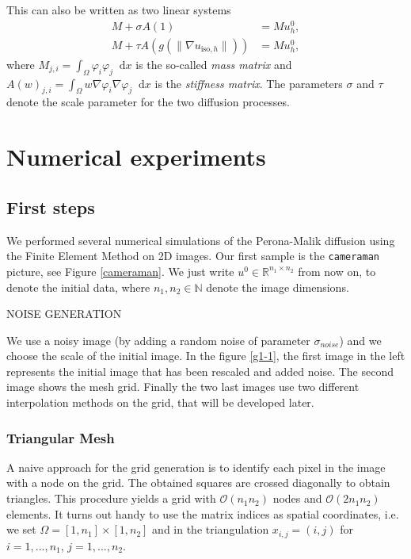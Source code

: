 \documentclass{report}
\renewcommand*\d{\mathop{}\!\mathrm{d}}
\renewcommand\phi{\varphi}
\renewcommand\O{\mathcal{O}}
\def\N{\mathbb{N}}
\def\R{\mathbb{R}}
\def\iso{\text{iso}}
\begin{document}
This can also be written as two linear systems
\begin{align}
	M + \sigma A(1) &= M u^0_h, \\
	M + \tau A(g(\|\nabla u_{\iso,h}\|)) &= M u^0_h,
\end{align}
where $M_{j,i} = \int_\Omega \phi_i \phi_j \d x$ is the so-called \emph{mass matrix} and $A(w)_{j,i} = \int_\Omega w \nabla \phi_i \nabla \phi_j \d x$ is the \emph{stiffness matrix}. The parameters $\sigma$ and $\tau$ denote the scale parameter for the two diffusion processes.

\section{Numerical experiments}

\subsection{First steps} 

We performed several numerical simulations of the Perona-Malik diffusion using the Finite Element Method on 2D images. Our first sample is the \texttt{cameraman} picture, see Figure \ref{cameraman}. We just write $u^0 \in \R^{n_1 \times n_2}$ from now on, to denote the initial data, where $n_1, n_2 \in \N$ denote the image dimensions.

NOISE GENERATION

We use a noisy image (by adding a random noise of parameter ${\sigma}_{noise}$) and we choose the scale of the initial image. In the figure \ref{g1-1}, the first image in the left represents the initial image that has been rescaled and added noise. The second image shows the mesh grid. Finally the two last images use two different interpolation methods on the grid, that will be developed later. \\

\subsubsection{Triangular Mesh}

A naive approach for the grid generation is to identify each pixel in the image with a node on the grid. The obtained squares are crossed diagonally to obtain triangles. This procedure yields a grid with $\O(n_1 n_2)$ nodes and $\O(2 n_1 n_2)$ elements. It turns out handy to use the matrix indices as spatial coordinates, i.e. we set $\Omega = [1,n_1] \times [1,n_2]$ and in the triangulation $x_{i,j} = (i,j)$ for $i=1,...,n_1$, $j=1,...,n_2$.
 
\end{document}
